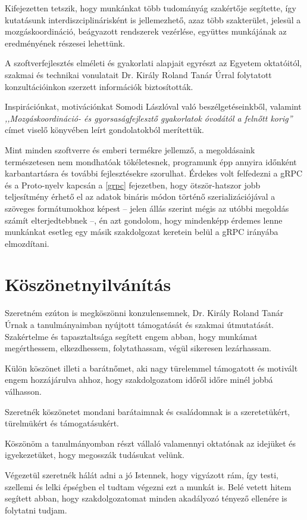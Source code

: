 \documentclass[tocnopagenum]{thesis-ekf}
\begin{document}
	Kifejezetten tetszik, hogy munkánkat több tudományág szakértője segítette, így kutatásunk interdiszciplinárisként is jellemezhető, azaz több szakterület, jelesül a mozgáskoordináció, beágyazott rendszerek vezérlése, együttes munkájának az eredményének részesei lehettünk.
	
	A szoftverfejlesztés elméleti és gyakorlati alapjait egyrészt az Egyetem oktatóitól, szakmai és technikai vonulatait Dr. Király Roland Tanár Úrral folytatott konzultációinkon szerzett információk biztosították. 
	
	Inspirációnkat, motivációnkat Somodi Lászlóval való beszélgetéseinkből, valamint \textit{,,Mozgáskoordináció- és gyorsaságfejlesztő gyakorlatok óvodától a felnőtt korig''} címet viselő könyvében leírt gondolatokból merítettük.
	
	Mint minden szoftverre és emberi termékre jellemző, a megoldásaink természetesen nem mondhatóak tökéletesnek, programunk épp annyira időnként karbantartásra és további fejlesztésekre szorulhat. Érdekes volt felfedezni a gRPC és a Proto-nyelv kapcsán a \ref{grpc} fejezetben, hogy ötször-hatszor jobb teljesítmény érhető el az adatok bináris módon történő szerializációjával a szöveges formátumokhoz képest -- jelen állás szerint mégis az utóbbi megoldás számít elterjedtebbnek --, én azt gondolom, hogy mindenképp érdemes lenne munkánkat esetleg egy másik szakdolgozat keretein belül a gRPC irányába elmozdítani.
	\section{Köszönetnyilvánítás}
	Szeretném ezúton is megköszönni konzulensemnek, Dr. Király Roland Tanár Úrnak a tanulmányaimban nyújtott támogatását és szakmai útmutatását. Szakértelme és tapasztaltsága segített engem abban, hogy munkámat megérthessem, elkezdhessem, folytathassam, végül sikeresen lezárhassam.
	
	Külön köszönet illeti a barátnőmet, aki nagy türelemmel támogatott és motivált engem hozzájárulva ahhoz, hogy szakdolgozatom időről időre minél jobbá válhasson.
	
	Szeretnék köszönetet mondani barátaimnak és családomnak is a szeretetükért, türelmükért és támogatásukért.
	
	Köszönöm a tanulmányomban részt vállaló valamennyi oktatónak az idejüket és igyekezetüket, hogy megosszák tudásukat velünk.
	
	Végezetül szeretnék hálát adni a jó Istennek, hogy vigyázott rám, így testi, szellemi és lelki épségben el tudtam végezni ezt a munkát is. Belé vetett hitem segített abban, hogy szakdolgozatomat minden akadályozó tényező ellenére is folytatni tudjam.
	
	
	\listoffigures
	
	
\end{document}
